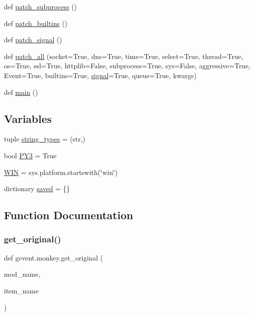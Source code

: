 \begin{DoxyCompactItemize}
\item 
def \hyperlink{namespacegevent_1_1monkey_a50e99d9b8101122d6168b660eb83d77e}{patch\+\_\+subprocess} ()
\item 
def \hyperlink{namespacegevent_1_1monkey_a78f107b224c0bb218b319d7dc4a67187}{patch\+\_\+builtins} ()
\item 
def \hyperlink{namespacegevent_1_1monkey_a39402c98ba8110d30f262ea6a0594aee}{patch\+\_\+signal} ()
\item 
def \hyperlink{namespacegevent_1_1monkey_a260d359ce3b17b34391adbab15f59a34}{patch\+\_\+all} (socket=True, dns=True, time=True, select=True, thread=True, os=True, ssl=True, httplib=False, subprocess=True, sys=False, aggressive=True, Event=True, builtins=True, \hyperlink{classgevent_1_1signal}{signal}=True, queue=True, kwargs)
\item 
def \hyperlink{namespacegevent_1_1monkey_a34e6151272ef3946238fd34ea5b8f643}{main} ()
\end{DoxyCompactItemize}
\subsection*{Variables}
\begin{DoxyCompactItemize}
\item 
tuple \hyperlink{namespacegevent_1_1monkey_a843df4ed92a84ef85d193b69b766507c}{string\+\_\+types} = (str,)
\item 
bool \hyperlink{namespacegevent_1_1monkey_a8426b2152217e404635e4e33c917cabb}{P\+Y3} = True
\item 
\hyperlink{namespacegevent_1_1monkey_a99c717c50e546ec3e7a21aec9239beab}{W\+IN} = sys.\+platform.\+startswith(\char`\"{}win\char`\"{})
\item 
dictionary \hyperlink{namespacegevent_1_1monkey_a0dce9d1ea2d50a7e9fa54491816ea488}{saved} = \{\}
\end{DoxyCompactItemize}


\subsection{Function Documentation}
\mbox{\label{namespacegevent_1_1monkey_a3128c39309cb9a10ee47a0307ac36b10}} 
\subsubsection{\texorpdfstring{get\+\_\+original()}{get\_original()}}
{\footnotesize\ttfamily def gevent.\+monkey.\+get\+\_\+original (\begin{DoxyParamCaption}\item[{}]{mod\+\_\+name,  }\item[{}]{item\+\_\+name }\end{DoxyParamCaption})}


